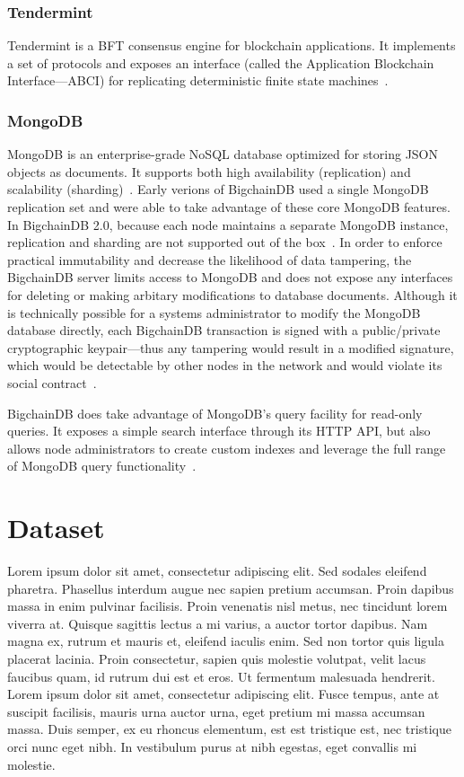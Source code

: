 \subsubsection{Tendermint}
Tendermint is a BFT consensus engine for blockchain applications. It
implements a set of protocols and exposes an interface (called the
Application Blockchain Interface---ABCI) for replicating deterministic
finite state machines~\cite{tender18}. 

\subsubsection{MongoDB}
MongoDB is an enterprise-grade NoSQL database optimized for storing
JSON objects as documents. It supports both high availability (replication)
and scalability (sharding)~\cite{mongo18}. Early verions of BigchainDB used
a single MongoDB replication set and were able to take advantage of these
core MongoDB features. In BigchainDB 2.0, because each node maintains a
separate MongoDB instance, replication and sharding are not supported out of
the box~\cite{troyM18b}. In order to enforce practical immutability and
decrease the likelihood of data tampering, the BigchainDB server limits
access to MongoDB and does not expose any interfaces for deleting or making
arbitary modifications to database documents. Although it is technically
possible for a systems administrator to modify the MongoDB database
directly, each BigchainDB transaction is signed with a public/private
cryptographic keypair---thus any tampering would result in a modified
signature, which would be detectable by other nodes in the network and would
violate its social contract~\cite{bigDB18}.

BigchainDB does take advantage of MongoDB's query facility for
read-only queries. It exposes a simple search interface through its HTTP
API, but also allows node administrators to create custom indexes and
leverage the full range of MongoDB query
functionality~\cite{bdb18d}.


\section{Dataset}
Lorem ipsum dolor sit amet, consectetur adipiscing elit. Sed sodales
eleifend pharetra. Phasellus interdum augue nec sapien pretium accumsan.
Proin dapibus massa in enim pulvinar facilisis. Proin venenatis nisl metus,
nec tincidunt lorem viverra at. Quisque sagittis lectus a mi varius, a
auctor tortor dapibus. Nam magna ex, rutrum et mauris et, eleifend iaculis
enim. Sed non tortor quis ligula placerat lacinia. Proin consectetur, sapien
quis molestie volutpat, velit lacus faucibus quam, id rutrum dui est et
eros. Ut fermentum malesuada hendrerit. Lorem ipsum dolor sit amet,
consectetur adipiscing elit. Fusce tempus, ante at suscipit facilisis,
mauris urna auctor urna, eget pretium mi massa accumsan massa. Duis semper,
ex eu rhoncus elementum, est est tristique est, nec tristique orci nunc eget
nibh. In vestibulum purus at nibh egestas, eget convallis mi molestie.

